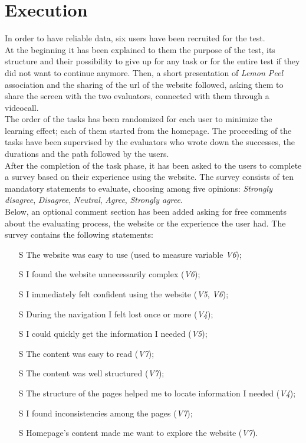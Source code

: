 \documentclass[../../UsabilityReport.tex]{subfiles}
\begin{document}
\section{Execution}\label{Execution-paragraph}
	In order to have reliable data, six users have been recruited for the test.\\
	At the beginning it has been explained to them the purpose of the test, its structure and their possibility to give up for any task or for the entire test if they did not want to continue anymore. Then, a short presentation of \textit{Lemon Peel} association and the sharing of the url of the website followed, asking them to share the screen with the two evaluators, connected with them through a videocall.\\
	The order of the tasks has been randomized for each user to minimize the learning effect; each of them started from the homepage. The proceeding of the tasks have been supervised by the evaluators who wrote down the successes, the durations and the path followed by the users.\\
	After the completion of the task phase, it has been asked to the users to complete a survey based on their experience using the website. The survey consists of ten mandatory statements to evaluate, choosing among five opinions: \textit{Strongly disagree}, \textit{Disagree}, \textit{Neutral}, \textit{Agree}, \textit{Strongly agree}.\\
	Below, an optional comment section has been added asking for free comments about the evaluating process, the website or the experience the user had.
	The survey contains the following statements:
	\label{statements}
	\begin{itemize}
		\item[S\subs{1}] The website was easy to use (used to measure variable \textit{V6});
		\item[S\subs{2}] I found the website unnecessarily complex (\textit{V6});
		\item[S\subs{3}] I immediately felt confident using the website (\textit{V5}, \textit{V6});
		\item[S\subs{4}] During the navigation I felt lost once or more (\textit{V4});
		\item[S\subs{5}] I could quickly get the information I needed (\textit{V5});
		\item[S\subs{6}] The content was easy to read (\textit{V7});
		\item[S\subs{7}] The content was well structured (\textit{V7});
		\item[S\subs{8}] The structure of the pages helped me to locate information I needed (\textit{V4});
		\item[S\subs{9}] I found inconsistencies among the pages (\textit{V7});
		\item[S\subs{10}] Homepage’s content made me want to explore the website (\textit{V7}).
	\end{itemize}
\end{document}

